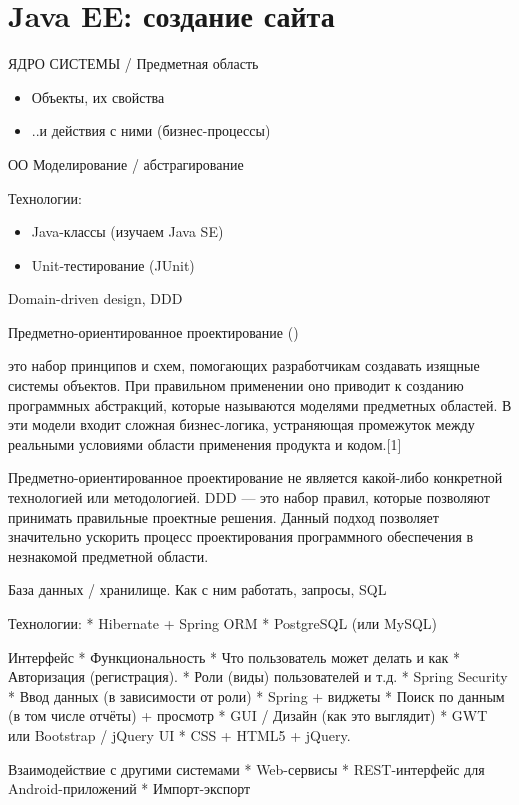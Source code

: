 \section{Java EE: создание сайта}

\begin{frame}[t]{ЯДРО СИСТЕМЫ / Предметная область}

  \begin{itemize}
    \item Объекты, их свойства
    \item ..и действия с ними (бизнес-процессы)
  \end{itemize}

  ОО Моделирование / абстрагирование

Технологии: 
  \begin{itemize}
    \item Java-классы (изучаем Java SE) 
    \item Unit-тестирование (JUnit)
  \end{itemize}
\end{frame}


\begin{frame}[t]{Domain-driven design, DDD}


Предметно-ориентированное проектирование ()

это набор принципов и схем, помогающих разработчикам создавать изящные системы объектов. При правильном применении оно приводит к созданию программных абстракций, которые называются моделями предметных областей. В эти модели входит сложная бизнес-логика, устраняющая промежуток между реальными условиями области применения продукта и кодом.[1]

Предметно-ориентированное проектирование не является какой-либо конкретной технологией или методологией. DDD — это набор правил, которые позволяют принимать правильные проектные решения. Данный подход позволяет значительно ускорить процесс проектирования программного обеспечения в незнакомой предметной области.





База данных / хранилище.
 Как с ним работать, запросы, SQL

Технологии:
 * Hibernate + Spring ORM
 * PostgreSQL (или MySQL)  

Интерфейс 
 * Функциональность
  * Что пользователь может делать и как
   * Авторизация (регистрация). 
     * Роли (виды) пользователей и т.д.
     * Spring Security 
   * Ввод данных (в зависимости от роли)
     * Spring + виджеты 
   * Поиск по данным (в том числе отчёты) + просмотр
 * GUI / Дизайн (как это выглядит)
   * GWT или Bootstrap / jQuery UI 
   * CSS + HTML5 + jQuery. 
    
Взаимодействие с другими системами
 * Web-сервисы
 * REST-интерфейс для Android-приложений
 * Импорт-экспорт
 


\end{frame}
